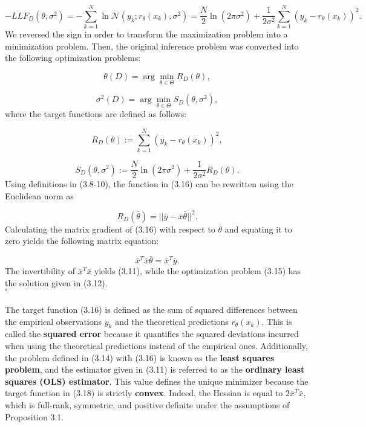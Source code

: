 \documentclass{report}
\begin{document}
\begin{equation}
-LLF_{D}(\theta,\sigma^2)=-\sum_{k=1}^N\ln\mathcal{N}(y_k;r_\theta(x_k),\sigma^2)=\frac{N}{2}\ln(2\pi\sigma^2)+\frac{1}{2\sigma^2}\sum_{k=1}^N(y_k-r_\theta(x_k))^2.
\end{equation}
We reversed the sign in order to transform the maximization problem into a minimization problem. Then, the original inference problem was converted into the following optimization problems:

\begin{equation}
\theta(D) = \arg\min_{\theta \in \Theta} R_{D}(\theta),
\end{equation}

\begin{equation}
\sigma^2(D) = \arg\min_{\theta \in \Theta} S_{D}(\theta, \sigma^2),
\end{equation}
where the target functions are defined as follows:

\begin{equation}
R_{D}(\theta) := \sum_{k=1}^N(y_k-r_\theta(x_k))^2,
\end{equation}

\begin{equation}
S_{D}(\theta,\sigma^2) := \frac{N}{2}\ln(2\pi\sigma^2)+\frac{1}{2\sigma^2}R_{D}(\theta).
\end{equation}
Using definitions in (3.8-10), the function in (3.16) can be rewritten using the Euclidean norm as

\begin{equation}
R_{D}(\bar{\theta}) = ||\bar{y} -\bar{x}\bar{\theta}||^2.
\end{equation}
Calculating the matrix gradient of (3.16) with respect to $\bar{\theta}$ and equating it to zero yields the following matrix equation:

\begin{equation}
\bar{x}^T\bar{x}\bar{\theta} = \bar{x}^T\bar{y}.
\end{equation}
The invertibility of $\bar{x}^T\bar{x}$ yields (3.11), while the optimization problem (3.15) has the solution given in (3.12).\\$\square$\\\\
The target function (3.16) is defined as the sum of squared differences between the empirical observations $y_k$ and the theoretical predictions $r_\theta(x_k)$. This is called the \textbf{squared error} because it quantifies the squared deviations incurred when using the theoretical predictions instead of the empirical ones. Additionally, the problem defined in (3.14) with (3.16) is known as the \textbf{least squares problem}, and the estimator given in (3.11) is referred to as the \textbf{ordinary least squares (OLS) estimator}. This value defines the unique minimizer because the target function in (3.18) is strictly \textbf{convex}. Indeed, the Hessian is equal to $2\bar{x}^T\bar{x}$, which is full-rank, symmetric, and positive definite under the assumptions of Proposition 3.1.
\end{document}
